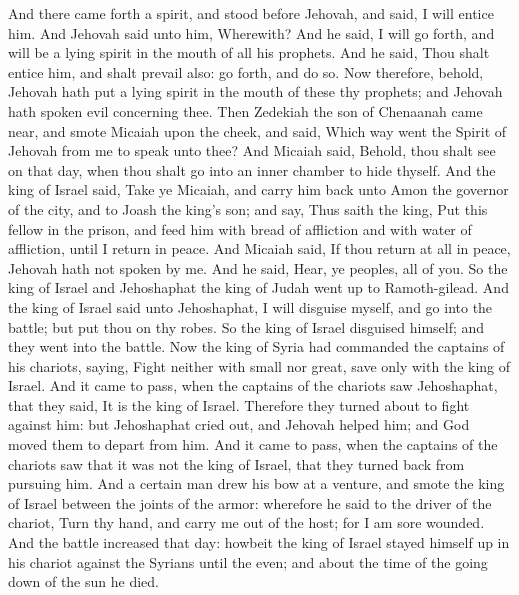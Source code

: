 And there came forth a spirit, and stood before Jehovah, and said, I will entice him. And Jehovah said unto him, Wherewith? And he said, I will go forth, and will be a lying spirit in the mouth of all his prophets. And he said, Thou shalt entice him, and shalt prevail also: go forth, and do so. Now therefore, behold, Jehovah hath put a lying spirit in the mouth of these thy prophets; and Jehovah hath spoken evil concerning thee.  Then Zedekiah the son of Chenaanah came near, and smote Micaiah upon the cheek, and said, Which way went the Spirit of Jehovah from me to speak unto thee? And Micaiah said, Behold, thou shalt see on that day, when thou shalt go into an inner chamber to hide thyself. And the king of Israel said, Take ye Micaiah, and carry him back unto Amon the governor of the city, and to Joash the king’s son; and say, Thus saith the king, Put this fellow in the prison, and feed him with bread of affliction and with water of affliction, until I return in peace. And Micaiah said, If thou return at all in peace, Jehovah hath not spoken by me. And he said, Hear, ye peoples, all of you.  So the king of Israel and Jehoshaphat the king of Judah went up to Ramoth-gilead. And the king of Israel said unto Jehoshaphat, I will disguise myself, and go into the battle; but put thou on thy robes. So the king of Israel disguised himself; and they went into the battle. Now the king of Syria had commanded the captains of his chariots, saying, Fight neither with small nor great, save only with the king of Israel. And it came to pass, when the captains of the chariots saw Jehoshaphat, that they said, It is the king of Israel. Therefore they turned about to fight against him: but Jehoshaphat cried out, and Jehovah helped him; and God moved them to depart from him. And it came to pass, when the captains of the chariots saw that it was not the king of Israel, that they turned back from pursuing him. And a certain man drew his bow at a venture, and smote the king of Israel between the joints of the armor: wherefore he said to the driver of the chariot, Turn thy hand, and carry me out of the host; for I am sore wounded. And the battle increased that day: howbeit the king of Israel stayed himself up in his chariot against the Syrians until the even; and about the time of the going down of the sun he died. 

